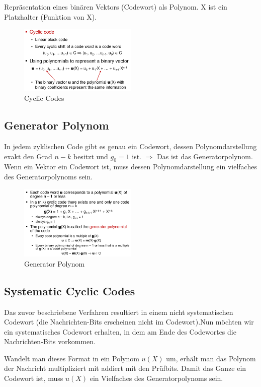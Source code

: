Repräsentation eines binären Vektors (Codewort) als Polynom.
X ist ein Platzhalter (Funktion von X).

\begin{figure}[H]
\centering
\includegraphics[width=0.5\textwidth]{figures/cyclic_codes.png}
\caption{Cyclic Codes}
\end{figure}

\subsection{Generator Polynom}
In jedem zyklischen Code gibt es genau ein Codewort, dessen Polynomdarstellung exakt den Grad $n-k$ besitzt und $g_0 = 1$ ist. $\Rightarrow$ Das ist das Generatorpolynom. \\

Wenn ein Vektor ein Codewort ist, muss dessen Polynomdarstellung ein vielfaches des Generatorpolynoms sein.

\begin{figure}[H]
\centering
\includegraphics[width=0.5\textwidth]{figures/generator_polynom.png}
\caption{Generator Polynom}
\end{figure}

\subsection{Systematic Cyclic Codes}
Das zuvor beschriebene Verfahren resultiert in einem nicht systematischen Codewort (die Nachrichten-Bits erscheinen nicht im Codewort).Nun möchten wir ein systematisches Codewort erhalten, in dem am Ende des Codewortes die Nachrichten-Bits vorkommen.

Wandelt man dieses Format in ein Polynom $u(X)$ um, erhält man das Polynom der Nachricht multipliziert mit  addiert mit den Prüfbits. Damit das Ganze ein Codewort ist, muss $u(X)$ ein Vielfaches des Generatorpolynoms sein.

